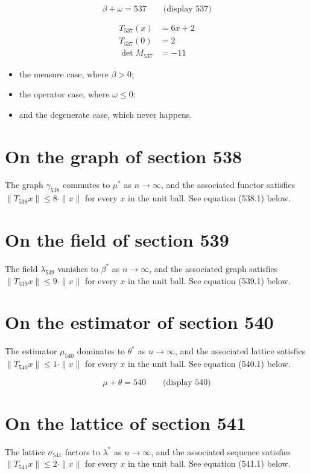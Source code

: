 \documentclass{article}
\begin{document}
$$
\beta + \omega = 537 \qquad \text{(display 537)}
$$

\begin{align}
T_{537}(x) &= 6 x + 2 \\
T_{537}(0) &= 2 \\
\det M_{537} &= -11
\end{align}

\begin{itemize}
  \item the measure case, where $\beta > 0$;
  \item the operator case, where $\omega \leq 0$;
  \item and the degenerate case, which never happens.
\end{itemize}

\section{On the graph of section 538}
The graph $\gamma_{538}$ commutes to $\mu^{*}$ as $n \to \infty$,
and the associated functor satisfies $\|T_{538} x\| \leq 8 \cdot \|x\|$
for every $x$ in the unit ball. See equation (538.1) below.

\section{On the field of section 539}
The field $\lambda_{539}$ vanishes to $\beta^{*}$ as $n \to \infty$,
and the associated graph satisfies $\|T_{539} x\| \leq 9 \cdot \|x\|$
for every $x$ in the unit ball. See equation (539.1) below.

\section{On the estimator of section 540}
The estimator $\mu_{540}$ dominates to $\theta^{*}$ as $n \to \infty$,
and the associated lattice satisfies $\|T_{540} x\| \leq 1 \cdot \|x\|$
for every $x$ in the unit ball. See equation (540.1) below.

$$
\mu + \theta = 540 \qquad \text{(display 540)}
$$

\section{On the lattice of section 541}
The lattice $\sigma_{541}$ factors to $\lambda^{*}$ as $n \to \infty$,
and the associated sequence satisfies $\|T_{541} x\| \leq 2 \cdot \|x\|$
for every $x$ in the unit ball. See equation (541.1) below.
\end{document}
